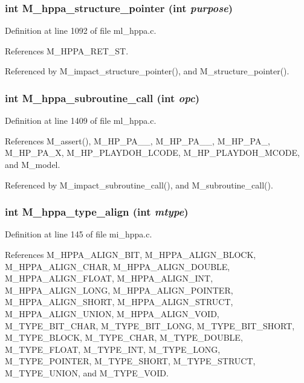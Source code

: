 \subsubsection{\setlength{\rightskip}{0pt plus 5cm}int M\_\-hppa\_\-structure\_\-pointer (int {\em purpose})}\label{m__hppa_8h_6f4b575dbcf3324e01b0b942b47b5858}




Definition at line 1092 of file ml\_\-hppa.c.

References M\_\-HPPA\_\-RET\_\-ST.

Referenced by M\_\-impact\_\-structure\_\-pointer(), and M\_\-structure\_\-pointer().
\subsubsection{\setlength{\rightskip}{0pt plus 5cm}int M\_\-hppa\_\-subroutine\_\-call (int {\em opc})}\label{m__hppa_8h_ef4b7cd187d6fe04d3b682be887b3eb1}




Definition at line 1409 of file ml\_\-hppa.c.

References M\_\-assert(), M\_\-HP\_\-PA\_\_, M\_\-HP\_\-PA\_\_, M\_\-HP\_\-PA\_, M\_\-HP\_\-PA\_\-X, M\_\-HP\_\-PLAYDOH\_\-LCODE, M\_\-HP\_\-PLAYDOH\_\-MCODE, and M\_\-model.

Referenced by M\_\-impact\_\-subroutine\_\-call(), and M\_\-subroutine\_\-call().
\subsubsection{\setlength{\rightskip}{0pt plus 5cm}int M\_\-hppa\_\-type\_\-align (int {\em mtype})}\label{m__hppa_8h_29613fa80645c0fa246371f4c085d428}




Definition at line 145 of file mi\_\-hppa.c.

References M\_\-HPPA\_\-ALIGN\_\-BIT, M\_\-HPPA\_\-ALIGN\_\-BLOCK, M\_\-HPPA\_\-ALIGN\_\-CHAR, M\_\-HPPA\_\-ALIGN\_\-DOUBLE, M\_\-HPPA\_\-ALIGN\_\-FLOAT, M\_\-HPPA\_\-ALIGN\_\-INT, M\_\-HPPA\_\-ALIGN\_\-LONG, M\_\-HPPA\_\-ALIGN\_\-POINTER, M\_\-HPPA\_\-ALIGN\_\-SHORT, M\_\-HPPA\_\-ALIGN\_\-STRUCT, M\_\-HPPA\_\-ALIGN\_\-UNION, M\_\-HPPA\_\-ALIGN\_\-VOID, M\_\-TYPE\_\-BIT\_\-CHAR, M\_\-TYPE\_\-BIT\_\-LONG, M\_\-TYPE\_\-BIT\_\-SHORT, M\_\-TYPE\_\-BLOCK, M\_\-TYPE\_\-CHAR, M\_\-TYPE\_\-DOUBLE, M\_\-TYPE\_\-FLOAT, M\_\-TYPE\_\-INT, M\_\-TYPE\_\-LONG, M\_\-TYPE\_\-POINTER, M\_\-TYPE\_\-SHORT, M\_\-TYPE\_\-STRUCT, M\_\-TYPE\_\-UNION, and M\_\-TYPE\_\-VOID.

